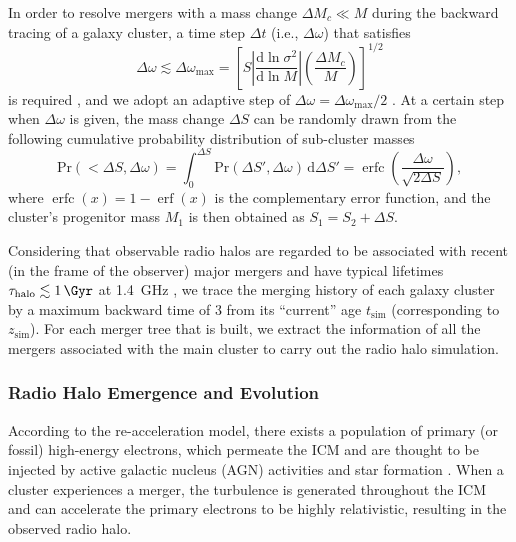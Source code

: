 \documentclass[modern]{aastex62}
\newcommand{\R}[1]{\mathrm{#1}}
\newcommand{\D}[1]{\R{d} #1}
\newcommand{\diff}[2]{\frac{\D{#1}}{\D{#2}}}
\DeclareMathOperator{\erf}{erf}
\DeclareMathOperator{\erfc}{erfc}
\begin{document}
In order to resolve mergers with a mass change $\Delta M_c \ll M$
during the backward tracing of a galaxy cluster, a time step $\Delta t$
(i.e., $\Delta\omega$) that satisfies
\begin{equation}
  \label{sec:dw-step}
  \Delta\omega \lesssim \Delta\omega_{\R{max}} = \left[
    S \left| \diff{\ln \sigma^2}{\ln M} \right|
    \left( \frac{\Delta M_c}{M} \right) \right]^{1/2}
\end{equation}
is required \citep{lacey1993}, and we adopt an adaptive step of
$\Delta\omega = \Delta\omega_{\R{max}} / 2$ \citep{randall2002}.
At a certain step when $\Delta\omega$ is given, the mass change
$\Delta S$ can be randomly drawn from the following cumulative
probability distribution of sub-cluster masses
\begin{equation}
  \label{sec:cdf-sub-masses}
  \R{Pr}(<\!\Delta S, \Delta\omega) =
  \int_0^{\Delta S} \R{Pr}(\Delta S', \Delta\omega) \,\D{\Delta S'} =
  \erfc \!\left( \frac{\Delta \omega}{\sqrt{2 \Delta S}} \right),
\end{equation}
where $\erfc(x) = 1 - \erf(x)$ is the complementary error function,
and the cluster's progenitor mass $M_1$ is then obtained as
$S_1 = S_2 + \Delta S$.

Considering that observable radio halos are regarded to be associated
with recent (in the frame of the observer) major mergers
and have typical lifetimes $\tau_{\R{halo}} \lesssim \SI{1}{\Gyr}$
at \SI{1.4}{\GHz} \citep[e.g.,][]{brunetti2009,cassano2016},
we trace the merging history of each galaxy cluster by a maximum
backward time of \SI{3}{\Gyr} from its \enquote{current} age
$t_{\R{sim}}$ (corresponding to $z_{\R{sim}}$).
For each merger tree that is built, we extract the information of all
the mergers associated with the main cluster to carry out the
radio halo simulation.


\subsubsection{Radio Halo Emergence and Evolution}
\label{sec:halos}

According to the re-acceleration model, there exists a population of
primary (or fossil) high-energy electrons, which permeate the ICM and
are thought to be injected by active galactic nucleus (AGN) activities
and star formation \citep[see][for a review]{blasi2007rev}.
When a cluster experiences a merger, the turbulence is generated
throughout the ICM and can accelerate the primary electrons to be highly
relativistic, resulting in the observed radio halo.
\end{document}
